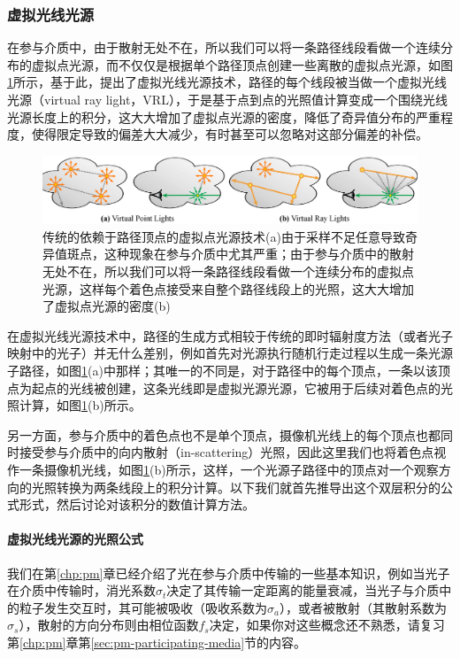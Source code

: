 \subsubsection{虚拟光线光源}\label{sec:ir-vrl}
在参与介质中，由于散射无处不在，所以我们可以将一条路径线段看做一个连续分布的虚拟点光源，而不仅仅是根据单个路径顶点创建一些离散的虚拟点光源，如图\ref{f:ir-vpl-vs-vrl}所示，基于此，\cite{a:VirtualRayLightsforRenderingSceneswithParticipatingMedia}提出了虚拟光线光源技术，路径的每个线段被当做一个虚拟光线光源（virtual ray light，VRL），于是基于点到点的光照值计算变成一个围绕光线光源长度上的积分，这大大增加了虚拟点光源的密度，降低了奇异值分布的严重程度，使得限定导致的偏差大大减少，有时甚至可以忽略对这部分偏差的补偿。

\begin{figure}
\begin{fullwidth}
	\includegraphics[width=1.\thewidth]{figures/ir/vpl-vs-vrl}
	\caption{传统的依赖于路径顶点的虚拟点光源技术(a)由于采样不足任意导致奇异值斑点，这种现象在参与介质中尤其严重；由于参与介质中的散射无处不在，所以我们可以将一条路径线段看做一个连续分布的虚拟点光源，这样每个着色点接受来自整个路径线段上的光照，这大大增加了虚拟点光源的密度(b)}
	\label{f:ir-vpl-vs-vrl}
\end{fullwidth}
\end{figure}

在虚拟光线光源技术中，路径的生成方式相较于传统的即时辐射度方法（或者光子映射中的光子）并无什么差别，例如首先对光源执行随机行走过程以生成一条光源子路径，如图\ref{f:ir-vpl-vs-vrl}(a)中那样；其唯一的不同是，对于路径中的每个顶点，一条以该顶点为起点的光线被创建，这条光线即是虚拟光源光源，它被用于后续对着色点的光照计算，如图\ref{f:ir-vpl-vs-vrl}(b)所示。

另一方面，参与介质中的着色点也不是单个顶点，摄像机光线上的每个顶点也都同时接受参与介质中的向内散射（in-scattering）光照，因此这里我们也将着色点视作一条摄像机光线，如图\ref{f:ir-vpl-vs-vrl}(b)所示，这样，一个光源子路径中的顶点对一个观察方向的光照转换为两条线段上的积分计算。以下我们就首先推导出这个双层积分的公式形式，然后讨论对该积分的数值计算方法。




\paragraph{虚拟光线光源的光照公式}
我们在第\ref{chp:pm}章已经介绍了光在参与介质中传输的一些基本知识，例如当光子在介质中传输时，消光系数$\sigma_t$决定了其传输一定距离的能量衰减，当光子与介质中的粒子发生交互时，其可能被吸收（吸收系数为$\sigma_a$），或者被散射（其散射系数为$\sigma_s$），散射的方向分布则由相位函数$f_s$决定，如果你对这些概念还不熟悉，请复习第\ref{chp:pm}章第\ref{sec:pm-participating-media}节的内容。

